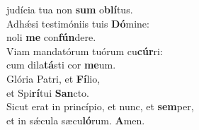 \evenverse judícia tua non \textbf{sum} o\textbf{blí}tus.\\
\oddverse Adhǽsi testimóniis tuis \textbf{Dó}mine:~\*\\
\oddverse noli \textbf{me} con\textbf{fún}dere.\\
\evenverse Viam mandatórum tuórum cu\textbf{cúr}ri:~\*\\
\evenverse cum dila\textbf{tá}sti cor \textbf{me}um.\\
\oddverse Glória Patri, et \textbf{Fí}lio,~\*\\
\oddverse et Spi\textbf{rí}tui \textbf{San}cto.\\
\evenverse Sicut erat in princípio, et nunc, et \textbf{sem}per,~\*\\
\evenverse et in sǽcula sæcu\textbf{ló}rum. \textbf{A}men.\\

